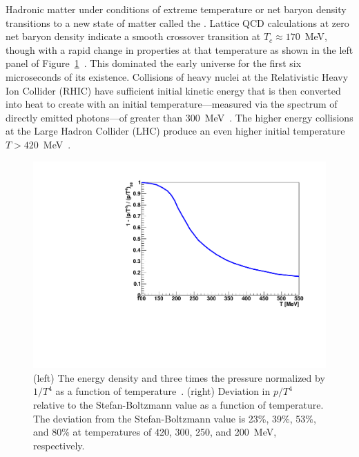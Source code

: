 Hadronic matter under conditions of extreme temperature or net baryon
density transitions to a new state of matter called the \qgp.  Lattice
QCD calculations at zero net baryon density indicate a smooth
crossover transition at $T_{c} \approx 170$~MeV, though with a rapid
change in properties at that temperature as shown in the left panel of
Figure~\ref{fig:lattice}~\cite{PhysRevD.80.014504}.  This \qgp
dominated the early universe for the first six microseconds of its
existence.  Collisions of heavy nuclei at the Relativistic Heavy Ion
Collider (RHIC) have sufficient initial kinetic energy that is then
converted into heat to create \qgp with an initial
temperature---measured via the spectrum of directly emitted
photons---of greater than 300~MeV~\cite{Adare:2008ab}. The higher
energy collisions at the Large Hadron Collider (LHC) produce an even
higher initial temperature $T > 420$~MeV~\cite{Luzum:2009sb}.

\begin{figure}[!hbt]
 \begin{center}
    \hfill
    \includegraphics[trim = 2 2 2 2, clip, width=0.52\linewidth]{figs/figure_physicscase_lattice_pdev}
    \caption[$E/3p$ and $p/T^{4}$ vs temperature]{(left) The energy density and three times the pressure
      normalized by $1/T^{4}$ as a function of
      temperature~\protect\cite{PhysRevD.80.014504}{}. (right) Deviation in 
      $p/T^{4}$ relative to the Stefan-Boltzmann value as a function
      of temperature.  The deviation from the Stefan-Boltzmann value is 23\%, 39\%, 53\%, and 80\% at
      temperatures of 420, 300, 250, and 200~MeV, respectively.
    \label{fig:lattice}}
 \end{center}
\end{figure}

